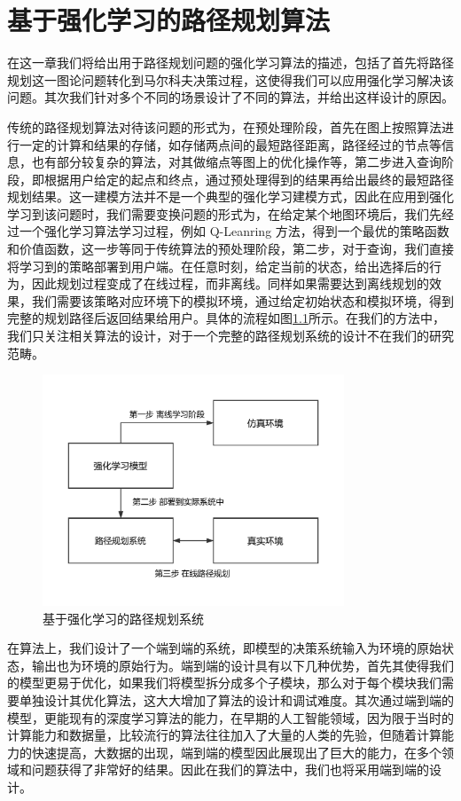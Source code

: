 \documentclass{standalone}
\begin{document}
	
\chapter{基于强化学习的路径规划算法}
在这一章我们将给出用于路径规划问题的强化学习算法的描述，包括了首先将路径规划这一图论问题转化到马尔科夫决策过程，这使得我们可以应用强化学习解决该问题。其次我们针对多个不同的场景设计了不同的算法，并给出这样设计的原因。\par
传统的路径规划算法对待该问题的形式为，在预处理阶段，首先在图上按照算法进行一定的计算和结果的存储，如存储两点间的最短路径距离，路径经过的节点等信息，也有部分较复杂的算法，对其做缩点等图上的优化操作等，第二步进入查询阶段，即根据用户给定的起点和终点，通过预处理得到的结果再给出最终的最短路径规划结果。这一建模方法并不是一个典型的强化学习建模方式，因此在应用到强化学习到该问题时，我们需要变换问题的形式为，在给定某个地图环境后，我们先经过一个强化学习算法学习过程，例如 Q-Leanring 方法，得到一个最优的策略函数和价值函数，这一步等同于传统算法的预处理阶段，第二步，对于查询，我们直接将学习到的策略部署到用户端。在任意时刻，给定当前的状态，给出选择后的行为，因此规划过程变成了在线过程，而非离线。同样如果需要达到离线规划的效果，我们需要该策略对应环境下的模拟环境，通过给定初始状态和模拟环境，得到完整的规划路径后返回结果给用户。具体的流程如图\ref{fig:system}所示。在我们的方法中，我们只关注相关算法的设计，对于一个完整的路径规划系统的设计不在我们的研究范畴。\par
\begin{figure}[H]
    \centering
    \includegraphics[width=9.0cm]{pic/system.pdf}
    \caption{基于强化学习的路径规划系统}
    \label{fig:system}
\end{figure}
在算法上，我们设计了一个端到端的系统，即模型的决策系统输入为环境的原始状态，输出也为环境的原始行为。端到端的设计具有以下几种优势，首先其使得我们的模型更易于优化，如果我们将模型拆分成多个子模块，那么对于每个模块我们需要单独设计其优化算法，这大大增加了算法的设计和调试难度。其次通过端到端的模型，更能现有的深度学习算法的能力，在早期的人工智能领域，因为限于当时的计算能力和数据量，比较流行的算法往往加入了大量的人类的先验，但随着计算能力的快速提高，大数据的出现，端到端的模型因此展现出了巨大的能力，在多个领域和问题获得了非常好的结果。因此在我们的算法中，我们也将采用端到端的设计。\par
\end{document}
